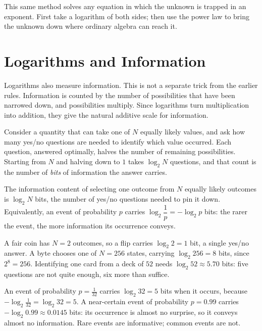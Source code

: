 \documentclass[12pt]{book}
\begin{document}
This same method solves any equation in which the unknown is trapped in an exponent.
First take a logarithm of both sides; then use the power law to bring the unknown down
where ordinary algebra can reach it.

\section{Logarithms and Information}

Logarithms also measure information. This is not a separate trick from the earlier
rules. Information is counted by the number of possibilities that have been narrowed
down, and possibilities multiply. Since logarithms turn multiplication into addition,
they give the natural additive scale for information.

Consider a quantity that can take one of $N$ equally likely values, and ask how many
yes/no questions are needed to identify which value occurred. Each question, answered
optimally, halves the number of remaining possibilities. Starting from $N$ and halving
down to $1$ takes $\log_2 N$ questions, and that count is the number of \emph{bits} of
information the answer carries.

\begin{keyidea}
The information content of selecting one outcome from $N$ equally likely outcomes is
$\log_2 N$ bits, the number of yes/no questions needed to pin it down. Equivalently,
an event of probability $p$ carries $\log_2\!\dfrac1p=-\log_2 p$ bits: the rarer the
event, the more information its occurrence conveys.
\end{keyidea}

\begin{example}
A fair coin has $N=2$ outcomes, so a flip carries $\log_2 2=1$ bit, a single yes/no
answer. A byte chooses one of $N=256$ states, carrying $\log_2 256=8$ bits, since
$2^{8}=256$. Identifying one card from a deck of $52$ needs
$\log_2 52\approx 5.70$ bits: five questions are not quite enough, six more than
suffice.
\end{example}

\begin{example}
An event of probability $p=\tfrac1{32}$ carries $\log_2 32=5$ bits when it occurs,
because $-\log_2\tfrac1{32}=\log_2 32=5$. A near-certain event of probability
$p=0.99$ carries $-\log_2 0.99\approx0.0145$ bits: its occurrence is almost no
surprise, so it conveys almost no information. Rare events are informative; common
events are not.
\end{example}
\end{document}

